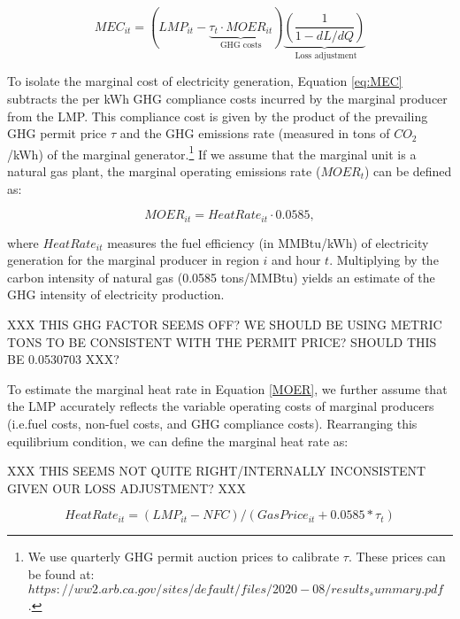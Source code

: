 \documentclass[11pt]{article}
\begin{document}
\begin{center}
\begin{equation}
\label{eq:MEC}
MEC_{it} = (LMP_{it}- \underbrace{\tau_t \cdot MOER_{it}}_{\text{GHG costs}} ) \underbrace{(\frac{1}{1-dL/dQ} )}_{\text{ Loss  adjustment}}
\end{equation}
\end{center}

To isolate the marginal cost of electricity generation, Equation \ref{eq:MEC} subtracts the per kWh GHG compliance costs incurred by the marginal producer from the LMP. This compliance cost is given by the product of the prevailing GHG permit price $\tau$ and the GHG emissions rate (measured in tons of $CO_2$/kWh) of the marginal generator.\footnote{We use quarterly GHG permit auction prices to calibrate $\tau$. These prices can be found at: $https://ww2.arb.ca.gov/sites/default/files/2020-08/results_summary.pdf$.}  If we assume that the marginal unit is a natural gas plant,  the marginal operating emissions rate ($MOER_t$) can be defined as:

\begin{center}
\begin{equation}
\label{MOER}
MOER_{it}= HeatRate_{it} \cdot 0.0585, 
\end{equation}
\end{center}

where $HeatRate_{it}$ measures the fuel efficiency (in MMBtu/kWh) of electricity generation for the marginal producer in region $i$ and hour $t$. Multiplying by the carbon intensity of natural gas (0.0585 tons/MMBtu) yields an estimate of the GHG intensity of electricity production. 

XXX THIS GHG FACTOR SEEMS OFF? WE SHOULD BE USING METRIC TONS TO BE CONSISTENT WITH THE PERMIT PRICE? SHOULD THIS BE 0.0530703 XXX?

To estimate the marginal heat rate in Equation \ref{MOER}, we further assume that 
the LMP accurately reflects the variable operating costs of marginal producers (i.e.fuel costs, non-fuel costs, and GHG compliance costs). Rearranging this equilibrium condition, we can define the marginal heat rate as:

XXX THIS SEEMS NOT QUITE RIGHT/INTERNALLY INCONSISTENT GIVEN OUR LOSS ADJUSTMENT? XXX

\begin{center}
\begin{equation*}
\label{eq:HR}
HeatRate_{it} = (LMP_{it}  - NFC) / (GasPrice_{it} + 0.0585 * \tau_t)
\end{equation*}
\end{center}
\end{document}
